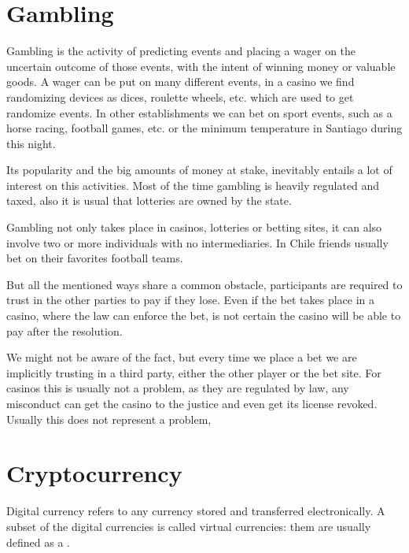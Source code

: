\begin{intro}
\section{Gambling}
Gambling is the activity of predicting events and placing a wager on the
  uncertain outcome of those events, with the intent of winning money or
  valuable goods.
A wager can be put on many different events, in a casino we find randomizing
  devices as dices, roulette wheels, etc. which are used to get randomize
  events. In other establishments we can bet on sport events, such as a horse
  racing, football games, etc. or the minimum temperature in Santiago during
  this night.
  
Its popularity and the big amounts of money at stake,
  inevitably entails a lot of interest on this activities. Most of the time
  gambling is heavily regulated and taxed, also it is usual that lotteries are
  owned by the state.

Gambling not only takes place in casinos, lotteries or betting sites, it can
  also involve two or more individuals with no intermediaries. In Chile
  friends usually bet on their favorites football teams.
  
But all the mentioned ways share a common obstacle, participants are required
  to trust in the other parties to pay if they lose.
  Even if the bet takes place in a casino, where the law can enforce the bet,
  is not certain the casino will be able to pay after the resolution.
  
We might not be aware of the fact, but every time we place a bet we are
  implicitly trusting in a third party, either the other player or the bet
  site. For casinos this is usually not a problem, as they are regulated by
  law, any misconduct can get the casino to the justice and even get its
  license revoked.
  Usually this does not represent a problem, 
  
  
\section{Cryptocurrency}
Digital currency refers to any currency stored and transferred
  electronically.
  A subset of the digital currencies is called virtual currencies: them are
  usually defined as a .
  

\end{intro}
